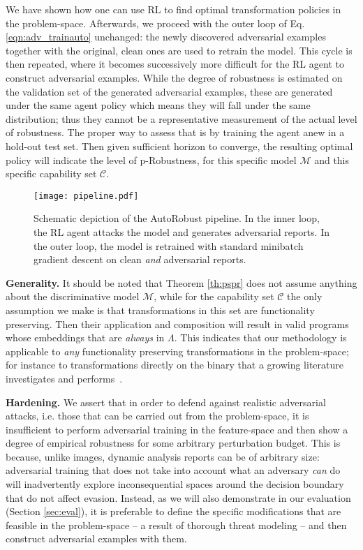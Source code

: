 We have shown how one can use RL to find optimal transformation policies in the problem-space.
Afterwards, we proceed with the outer loop of Eq. \eqref{eqn:adv_trainauto} unchanged: the newly discovered adversarial examples together with the original, clean ones are used to retrain the model.
This cycle is then repeated, where it becomes successively more difficult for the RL agent to construct adversarial examples.
While the degree of robustness is estimated on the validation set of the generated adversarial examples, these are generated under the same agent policy which means they will fall under the same distribution; thus they cannot be a representative measurement of the actual level of robustness.
The proper way to assess that is by training the agent anew in a hold-out test set.
Then given sufficient horizon to converge, the resulting optimal policy will indicate the level of p-Robustness, for this specific model $\mathcal{M}$ and this specific capability set $\mathcal{C}$.

\begin{figure*}[!t]
\centering
\texttt{[image: pipeline.pdf]}
\caption[Schematic depiction of the AutoRobust pipeline.]{Schematic depiction of the AutoRobust pipeline. In the inner loop, the RL agent attacks the model and generates adversarial reports. In the outer loop, the model is retrained with standard minibatch gradient descent on clean \textit{and} adversarial reports.}
\label{fig:autorobust}
\end{figure*}

\textbf{Generality.} It should be noted that Theorem \ref{th:pspr} does not assume anything about the discriminative model $\mathcal{M}$, while for the capability set $\mathcal{C}$ the only assumption we make is that transformations in this set are functionality preserving.
Then their application and composition will result in valid programs whose embeddings that are \textit{always} in $\Lambda$.
This indicates that our methodology is applicable to \textit{any} functionality preserving transformations in the problem-space; for instance to transformations directly on the binary that a growing literature investigates and performs~\cite{demetrio2021adversarial, demetrio2021functionality, labaca2021realizable, labaca2021aimed}.

\textbf{Hardening.} We assert that in order to defend against realistic adversarial attacks, i.e. those that can be carried out from the problem-space, it is insufficient to perform adversarial training in the feature-space and then show a degree of empirical robustness for some arbitrary perturbation budget.
This is because, unlike images, dynamic analysis reports can be of arbitrary size: adversarial training that does not take into account what an adversary \textit{can} do will inadvertently explore inconsequential spaces around the decision boundary that do not affect evasion.
Instead, as we will also demonstrate in our evaluation (Section \ref{sec:eval}), it is preferable to define the specific modifications that are feasible in the problem-space -- a result of thorough threat modeling -- and then construct adversarial examples with them.

